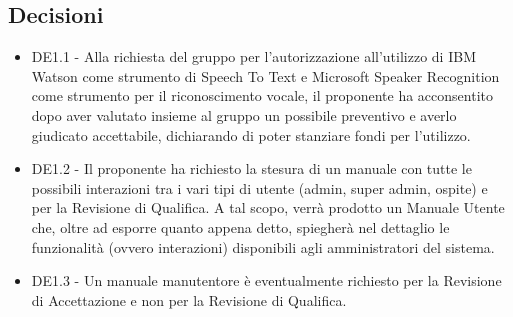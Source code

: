 \documentclass[a4paper,titlepage]{article}
\begin{document}
		\subsection{Decisioni}
		\begin{itemize}
			\item DE1.1 - Alla richiesta del gruppo per l'autorizzazione all'utilizzo di IBM Watson come strumento di Speech To Text e Microsoft Speaker Recognition come strumento per il riconoscimento vocale, il proponente \PROPONENTE{} ha acconsentito dopo aver valutato insieme al gruppo \GRUPPO{} un possibile preventivo e averlo giudicato accettabile, dichiarando di poter stanziare fondi per l'utilizzo.  
			\item DE1.2 - Il proponente ha richiesto la stesura di un manuale con tutte le possibili interazioni tra i vari tipi di utente (admin, super admin, ospite) e \PROGETTO{} per la Revisione di Qualifica. A tal scopo, verrà prodotto un Manuale Utente che, oltre ad esporre quanto appena detto, spiegherà nel dettaglio le funzionalità (ovvero interazioni) disponibili agli amministratori del sistema.
			\item DE1.3 - Un manuale manutentore è eventualmente richiesto per la Revisione di Accettazione e non per la Revisione di Qualifica.
		\end{itemize}
		
		
	
\end{document}
